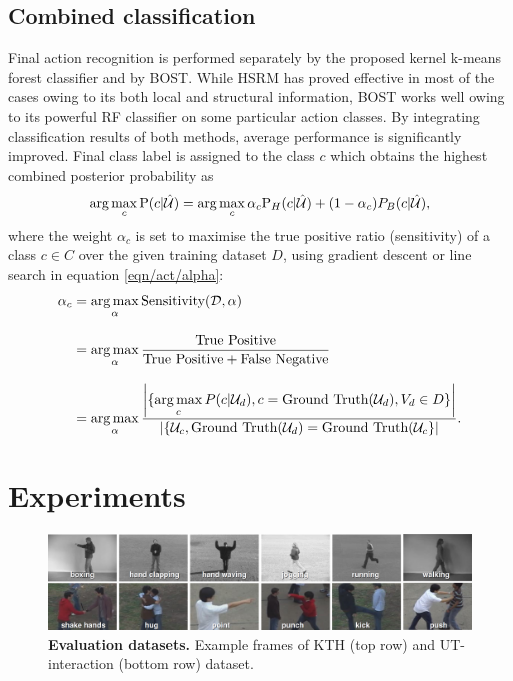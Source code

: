 \subsection{Combined classification} 
Final action recognition is performed separately by the proposed kernel k-means forest classifier and by BOST. While HSRM has proved effective in most of the cases owing to its both local and structural information, BOST works well owing to its powerful RF classifier on some particular action classes. By integrating classification results of both methods, average performance is significantly improved. Final class label is assigned to the class $c$ which obtains the highest combined posterior probability as
\begin{equation}
	\arg\max_{c}
	\mathrm{P}(c|\mathcal{\hat{U}}) = 
	\arg\max_{c}
	\alpha_c \mathrm{P}_{H}(c|\mathcal{\hat{U}}) + (1 - \alpha_c) P_{B}(c|\mathcal{\hat{U}}),
	\label{eqn/act/combine}
\end{equation}
where the weight $\alpha_c$ is set to maximise the true positive ratio (sensitivity) of a class $c \in C$ over the given training dataset $D$, using gradient descent or line search in equation \ref{eqn/act/alpha}:
\begin{equation}
\begin{aligned}
	\alpha_c & = \displaystyle\operatorname*{arg\,max}_{\alpha}\mbox{Sensitivity}(\mathcal{D},\alpha) \\[3mm]
	& = \displaystyle\operatorname*{arg\,max}_{\alpha}\displaystyle\frac{\mbox{True Positive}}{\mbox{True Positive} + \mbox{False Negative}} \\[3mm]
&= \displaystyle\operatorname*{arg\,max}_{\alpha}\displaystyle\frac{\left|\{\displaystyle\operatorname*{arg\,max}_{c}P(c|\mathcal{U}_d),c=\mbox{Ground Truth}(\mathcal{U}_d),V_d \in D\}\right|}{\left|\{\mathcal{U}_c, \mbox{Ground Truth}(\mathcal{U}_d) = \mbox{Ground Truth}(\mathcal{U}_c\}\right|}.
\end{aligned}
\label{eqn/act/alpha}
\end{equation}

\section{Experiments}
\label{sec/act/experiments}

\begin{figure}[th]
	\centering
	\includegraphics[width=1\linewidth]{fig/act/frames.png}
	\caption{\textbf{Evaluation datasets.} Example frames of KTH (top row) and UT-interaction (bottom row) dataset.}
	\label{fig/act/frames}
\end{figure}

